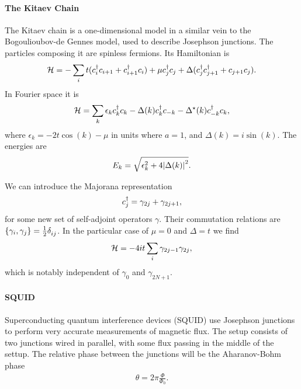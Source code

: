 \paragraph{The Kitaev Chain}
The Kitaev chain is a one-dimensional model in a similar vein to the Bogoulioubov-de Gennes model, used to describe Josephson junctions. The particles composing it are spinless fermions. Its Hamiltonian is
\begin{align*}
	\mathcal{H} = -\sum\limits_{i}t(c_{i}^{\dagger} c_{i + 1} + c_{i + 1}^{\dagger} c_{i}) + \mu c_{j}^{\dagger} c_{j} + \Delta(c_{j}^{\dagger} c_{j + 1}^{\dagger} + c_{j + 1}c_{j}).
\end{align*}
In Fourier space it is
\begin{align*}
	\mathcal{H} = \sum\limits_{k}\epsilon_{k}c_{k}^{\dagger} c_{k} - \Delta(k)c_{k}^{\dagger} c_{-k} - \Delta^{\star}(k)c_{-k}^{\dagger} c_{k},
\end{align*}
where $\epsilon_{k} = -2t\cos(k) - \mu$ in units where $a = 1$, and $\Delta(k) = i\sin(k)$. The energies are
\begin{align*}
	E_{k} = \sqrt{\epsilon_{k}^{2} + 4\abs{\Delta(k)}^{2}}.
\end{align*}

We can introduce the Majorana representation
\begin{align*}
	c_{j}^{\dagger} = \gamma_{2j} + \gamma_{2j + 1},
\end{align*}
for some new set of self-adjoint operators $\gamma$. Their commutation relations are $\acomm{\gamma_{i}}{\gamma_{j}} = \frac{1}{2}\kdelta{}{ij}$. In the particular case of $\mu = 0$ and $\Delta = t$ we find
\begin{align*}
	\mathcal{H} = -4it\sum\limits_{i}\gamma_{2j - 1}\gamma_{2j},
\end{align*}
which is notably independent of $\gamma_{0}$ and $\gamma_{2N + 1}$.

\paragraph{SQUID}
Superconducting quantum interference devices (SQUID) use Josephson junctions to perform very accurate measurements of magnetic flux. The setup consists of two junctions wired in parallel, with some flux passing in the middle of the settup. The relative phase between the junctions will be the Aharanov-Bohm phase
\begin{align*}
	\theta = 2\pi\frac{\Phi}{\Phi_{0}}.
\end{align*}